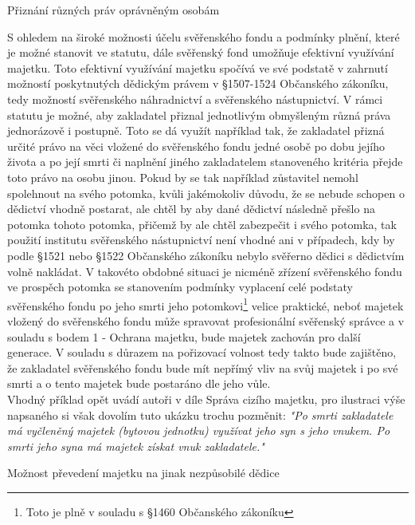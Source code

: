 \documentclass{article}
\begin{document}
  \begin{enumerate}
 {\Large\item[6.] Přiznání různých práv oprávněným osobám}
 \end{enumerate}
 
 S ohledem na široké možnosti účelu svěřenského fondu a podmínky plnění, které je možné stanovit ve statutu, dále svěřenský fond umožňuje efektivní využívání majetku. Toto efektivní využívání majetku spočívá ve své podstatě v zahrnutí možností poskytnutých dědickým právem v §1507-1524 Občanského zákoníku, tedy možností svěřenského náhradnictví a svěřenského nástupnictví. V rámci statutu je možné, aby zakladatel přiznal jednotlivým obmyšleným různá práva jednorázově i postupně. Toto se dá využít například tak, že zakladatel přizná určité právo na věci vložené do svěřenského fondu jedné osobě po dobu jejího života a po její smrti či naplnění jiného zakladatelem stanoveného kritéria přejde toto právo na osobu jinou. Pokud by se tak například zůstavitel nemohl spolehnout na svého potomka, kvůli jakémokoliv důvodu, že se nebude schopen o dědictví vhodně postarat, ale chtěl by aby dané dědictví následně přešlo na potomka tohoto potomka, přičemž by ale chtěl zabezpečit i svého potomka, tak použití institutu svěřenského nástupnictví není vhodné ani v případech, kdy by podle §1521 nebo §1522 Občanského zákoníku nebylo svěřerno dědici s dědictvím volně nakládat. V takovéto obdobné situaci je nicméně zřízení svěřenského fondu ve prospěch potomka se stanovením podmínky vyplacení celé podstaty svěřenského fondu po jeho smrti jeho potomkovi\footnote{Toto je plně v souladu s §1460 Občanského zákoníku} velice praktické, neboť majetek vložený do svěřenského fondu může spravovat profesionální svěřenský správce a v souladu s bodem 1 - Ochrana majetku, bude majetek zachován pro další generace. V souladu s důrazem na pořizovací volnost tedy takto bude zajištěno, že zakladatel svěřenského fondu bude mít nepřímý vliv na svůj majetek i po své smrti a o tento majetek bude postaráno dle jeho vůle.\\
 
 Vhodný příklad opět uvádí autoři v díle Správa cizího majetku, pro ilustraci výše napsaného si však dovolím tuto ukázku trochu pozměnit: \textit{"Po smrti zakladatele má vyčleněný majetek (bytovou jednotku) využívat jeho syn s jeho vnukem. Po smrti jeho syna má majetek získat vnuk zakladatele."}
 
   \begin{enumerate}
 {\Large\item[6.] Možnost převedení majetku na jinak nezpůsobilé dědice}
 \end{enumerate}
 
\end{document}

